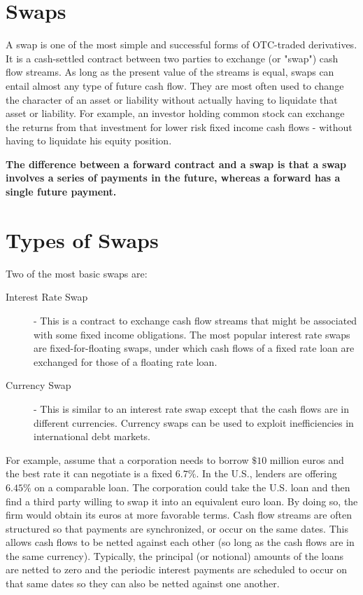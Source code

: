 \documentclass[11pt]{article} %
\begin{document}
\tableofcontents

\section{ Swaps}

A swap is one of the most simple and successful forms of OTC-traded derivatives. It is a cash-settled contract between two parties to exchange (or "swap") cash flow streams. As long as the present value of the streams is equal, swaps can entail almost any type of future cash flow. They are most often used to change the character of an asset or liability without actually having to liquidate that asset or liability. For example, an investor holding common stock can exchange the returns from that investment for lower risk fixed income cash flows - without having to liquidate his equity position. 
 

\bigskip
\noindent \textbf{The difference between a forward contract and a swap is that a swap involves a series of payments in the future, whereas a forward has a single future payment.}


\section{Types of Swaps}
Two of the most basic swaps are:

\begin{description}
\item[Interest Rate Swap] - This is a contract to exchange cash flow streams that might be associated with some fixed income obligations. The most popular interest rate swaps are fixed-for-floating swaps, under which cash flows of a fixed rate loan are exchanged for those of a floating rate loan. 
\item[Currency Swap] - This is similar to an interest rate swap except that the cash flows are in different currencies. Currency swaps can be used to exploit inefficiencies in international debt markets.
\end{description}

For example, assume that a corporation needs to borrow $\$10$ million euros and the best rate it can negotiate is a fixed $6.7\%$. In the U.S., lenders are offering $6.45\%$ on a comparable loan. The corporation could take the U.S. loan and then find a third party willing to swap it into an equivalent euro loan. By doing so, the firm would obtain its euros at more favorable terms. Cash flow streams are often structured so that payments are synchronized, or occur on the same dates. This allows cash flows to be netted against each other (so long as the cash flows are in the same currency). Typically, the principal (or notional) amounts of the loans are netted to zero and the periodic interest payments are scheduled to occur on that same dates so they can also be netted against one another.


\end{document}
